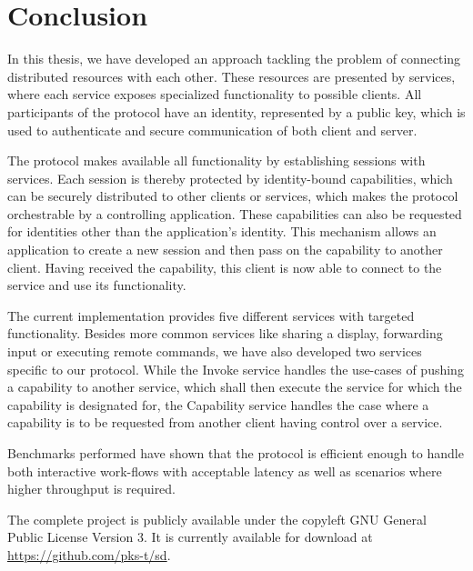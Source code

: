 \chapter{Conclusion}

In this thesis, we have developed an approach tackling the problem of connecting distributed resources with each other.
These resources are presented by services, where each service exposes specialized functionality to possible clients.
All participants of the protocol have an identity, represented by a public key, which is used to authenticate and secure communication of both client and server.

The protocol makes available all functionality by establishing sessions with services.
Each session is thereby protected by identity-bound capabilities, which can be securely distributed to other clients or services, which makes the protocol orchestrable by a controlling application.
These capabilities can also be requested for identities other than the application's identity.
This mechanism allows an application to create a new session and then pass on the capability to another client.
Having received the capability, this client is now able to connect to the service and use its functionality.

The current implementation provides five different services with targeted functionality.
Besides more common services like sharing a display, forwarding input or executing remote commands, we have also developed two services specific to our protocol.
While the Invoke service handles the use-cases of pushing a capability to another service, which shall then execute the service for which the capability is designated for, the Capability service handles the case where a capability is to be requested from another client having control over a service.

Benchmarks performed have shown that the protocol is efficient enough to handle both interactive work-flows with acceptable latency as well as scenarios where higher throughput is required.

The complete project is publicly available under the copyleft GNU General Public License Version 3.
It is currently available for download at \url{https://github.com/pks-t/sd}.

